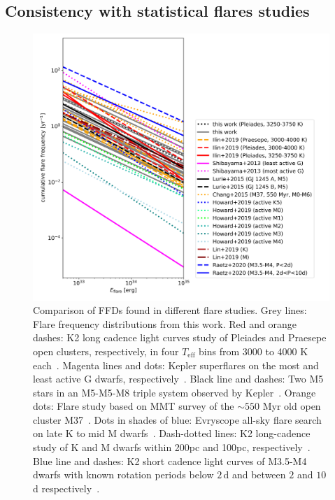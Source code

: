\documentclass{aa}
\begin{document}
\subsection{Consistency with statistical flares studies}
\label{sec:consistency_other_work}
\begin{figure}
    \centering
    \includegraphics[width=13.5cm]{pics/FFDs/discussion_FFDs.png}
    \caption{Comparison of FFDs found in different flare studies. Grey lines: Flare frequency distributions from this work. Red and orange dashes: K2 long cadence light curves study of Pleiades and Praesepe open clusters, respectively, in four $T_\mathrm{eff}$ bins from 3000 to 4000 K each~\citep{PaperI}. Magenta lines and dots: Kepler superflares on the most and least active G dwarfs, respectively~\citep{shibayama2013}. Black line and dashes: Two M5 stars in an M5-M5-M8 triple system observed by Kepler~\citep{lurie2015}. Orange dots: Flare study based on MMT survey of the $\sim550$ Myr old open cluster M37~\citep{chang2015}. Dots in shades of blue: Evryscope all-sky flare search on late K to mid M dwarfs~\citep{howard2019}. Dash-dotted lines: K2 long-cadence study of K and M dwarfs within 200pc and 100pc, respectively~\citep{lin2019}. Blue line and dashes: K2 short cadence light curves of M3.5-M4 dwarfs with known rotation periods below $2\,$d and between $2$ and $10\,$d respectively~\citep{raetz2020}.}          
    \label{fig:otherwork}
\end{figure}
\end{document}
